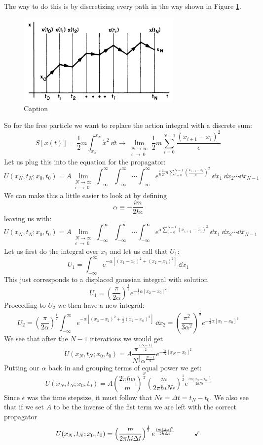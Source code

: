 \documentclass[a4,10pt,titlepage]{article}
\renewcommand\[{\begin{equation*}}
\renewcommand\]{\end{equation*}}
\newcommand{\be}{\begin{equation}}
\newcommand{\ee}{\end{equation}}
\numberwithin{equation}{section}
\newcommand{\lp}{\left}
\newcommand{\rp}{\right}
\newcommand{\half}{\frac{1}{2}}
\begin{document}
The way to do this is by discretizing every path in the way shown in Figure \ref{fig:my_label6}.

\begin{figure}[htb]
    \centering
    \includegraphics[width=8cm]{discrete.PNG}
    \caption{Caption}
    \label{fig:my_label6}
\end{figure}

So for the free particle we want to replace the action integral with a discrete sum:
\be
S[x(t)]=\half m\int_{x_0}^{x_N}\dot{x}^2 \:\dd t\rightarrow\lim_{\substack{N\rightarrow\infty\\\epsilon\:\rightarrow\:0}} \half m \sum_{i=0}^{N-1}\frac{\lp(x_{i+1}-x_i\rp)^2}{\epsilon}
\ee
Let us plug this into the equation for the propagator:
\[
U(x_N,t_N;x_0,t_0)=A\lim_{\substack{N\rightarrow\infty\\\epsilon\:\rightarrow\:0}} \int_{-\infty}^{\infty}\int_{-\infty}^{\infty}\cdots\int_{-\infty}^{\infty}e^{\frac{i}{\hbar}\half m \sum_{i=0}^{N-1}\lp(\frac{x_{i+1}-x_i}{\epsilon}\rp)^2}\:\dd x_1\:\dd x_2\cdots\dd x_{N-1}
\]
We can make this a little easier to look at by defining
\[
\alpha\equiv-\frac{im}{2\hbar\epsilon}
\]
leaving us with:
\[
U(x_N,t_N;x_0,t_0)=A\lim_{\substack{N\rightarrow\infty\\\epsilon\:\rightarrow\:0}} \int_{-\infty}^{\infty}\int_{-\infty}^{\infty}\cdots\int_{-\infty}^{\infty}e^{\alpha \sum_{i=0}^{N-1}\lp(x_{i+1}-x_i\rp)^2}\:\dd x_1\:\dd x_2\cdots\dd x_{N-1}
\]
Let us first do the integral over $x_1$ and let us call that $U_1$:
\[
U_1=\int_{-\infty}^{\infty}e^{-\alpha\lp[\lp(x_1-x_0\rp)^2+\lp(x_2-x_1\rp)^2\rp]}\:\dd x_1
\]
This just corresponds to a displaced gaussian integral with solution
\[
U_1=\lp(\frac{\pi}{2\alpha}\rp)^\half e^{-\half\alpha\lp[x_2-x_0\rp]^2}
\]
Proceeding to $U_2$ we then have a new integral:
\[
U_2=\lp(\frac{\pi}{2\alpha}\rp)^\half\int_{-\infty}^{\infty}e^{-\alpha\lp[\lp(x_3-x_2\rp)^2+\frac{1}{2}\lp(x_2-x_0\rp)^2\rp]}\:\dd x_2=\lp(\frac{\pi^2}{3\alpha^2}\rp)^\half e^{-\frac{1}{3}\alpha[x_3-x_0]^2}
\]
We see that after the $N-1$ itterations we would get
\[
U(x_N,t_N;x_0,t_0)=A\frac{\pi^{\frac{(N-1)}{2}}}{N^{\half}\alpha^{\frac{N-1}{2}}}e^{-\frac{\alpha}{N}\lp[x_N-x_0\rp]^2}
\]
Putting our $\alpha$ back in and grouping terms of equal power we get:
\[
U(x_N,t_N;x_0,t_0)=A\lp(\frac{2\pi\hbar\epsilon i}{m}\rp)^{\frac{N}{2}}\lp(\frac{m}{2\pi \hbar i N\epsilon}\rp)^{\frac{1}{2}}e^{\frac{im\lp[x_N-x_0\rp]^2}{2\hbar N\epsilon}}
\]
Since $\epsilon$ was the time stepsize, it must follow that $N\epsilon=\Delta t=t_N-t_0$. We also see that if we set $A$ to be the inverse of the fist term we are left with the correct propagator
\be
U(x_N,t_N;x_0,t_0)=\lp(\frac{m}{2\pi \hbar i \Delta t}\rp)^{\frac{1}{2}}e^{\frac{im[\Delta x]^2}{2\hbar \Delta t}}\hspace*{1cm}\checkmark
\ee
\end{document}
